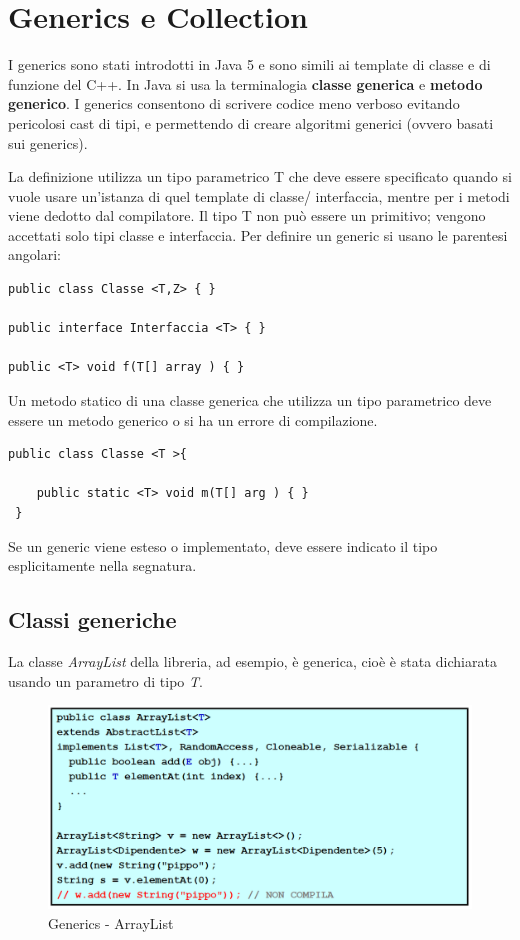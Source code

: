 \section{Generics e Collection}
I generics sono stati introdotti in Java 5 e sono simili ai template di classe e di funzione del C++. In Java si usa la terminalogia \textbf{classe generica} e \textbf{metodo generico}.
I generics consentono di scrivere codice meno verboso evitando pericolosi cast di tipi, e permettendo di creare algoritmi generici (ovvero basati sui generics).

La definizione utilizza un tipo parametrico T che deve essere specificato quando si vuole usare un’istanza di quel template di classe/
interfaccia, mentre per i metodi viene dedotto dal compilatore. Il tipo T non può essere un primitivo; vengono accettati solo tipi classe e interfaccia.
Per definire un generic si usano le parentesi angolari:
\begin{lstlisting}
public class Classe <T,Z> { }

public interface Interfaccia <T> { }
 
public <T> void f(T[] array ) { }
\end{lstlisting}
Un metodo statico di una classe generica che utilizza un tipo parametrico deve essere un metodo generico o si ha un errore di compilazione.
\begin{lstlisting}
public class Classe <T >{

	public static <T> void m(T[] arg ) { }
 }
\end{lstlisting}
Se un generic viene esteso o implementato, deve essere indicato il tipo esplicitamente nella segnatura.

\subsection{Classi generiche}

La classe \textit{ArrayList} della libreria, ad esempio, è generica, cioè è stata dichiarata usando un parametro di tipo \textit{T}.

\begin{figure}[H]
\centering
\includegraphics[scale=0.6]{images/classiGeneriche1}
\caption{Generics - ArrayList\label{fig:UC3}}
\end{figure}

